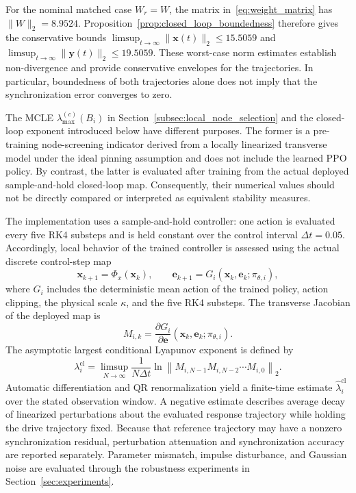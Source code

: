\documentclass[a4paper,fleqn]{cas-sc}
\theoremstyle{plain}
\theoremstyle{definition}
\begin{document}
For the nominal matched case $W_r=W$, the matrix in~\eqref{eq:weight_matrix} has $\|W\|_2=8.9524$. Proposition~\ref{prop:closed_loop_boundedness} therefore gives the conservative bounds $\limsup_{t\to\infty}\|\mathbf{x}(t)\|_2\leq15.5059$ and $\limsup_{t\to\infty}\|\mathbf{y}(t)\|_2\leq19.5059$. These worst-case norm estimates establish non-divergence and provide conservative envelopes for the trajectories. In particular, boundedness of both trajectories alone does not imply that the synchronization error converges to zero.

The MCLE $\lambda_{\max}^{(c)}(B_i)$ in Section~\ref{subsec:local_node_selection} and the closed-loop exponent introduced below have different purposes. The former is a pre-training node-screening indicator derived from a locally linearized transverse model under the ideal pinning assumption and does not include the learned PPO policy. By contrast, the latter is evaluated after training from the actual deployed sample-and-hold closed-loop map. Consequently, their numerical values should not be directly compared or interpreted as equivalent stability measures.

The implementation uses a sample-and-hold controller: one action is evaluated every five RK4 substeps and is held constant over the control interval $\Delta t=0.05$. Accordingly, local behavior of the trained controller is assessed using the actual discrete control-step map
\begin{equation}
	\mathbf{x}_{k+1}=\Phi_x(\mathbf{x}_k),
	\qquad
	\mathbf{e}_{k+1}=G_i(\mathbf{x}_k,\mathbf{e}_k;\pi_{\theta,i}),
	\label{eq:sampled_closed_loop_map}
\end{equation}
where $G_i$ includes the deterministic mean action of the trained policy, action clipping, the physical scale $\kappa$, and the five RK4 substeps. The transverse Jacobian of the deployed map is
\begin{equation}
	M_{i,k}
	=
	\frac{\partial G_i}{\partial\mathbf{e}}
	(\mathbf{x}_k,\mathbf{e}_k;\pi_{\theta,i}).
	\label{eq:sampled_error_jacobian}
\end{equation}
The asymptotic largest conditional Lyapunov exponent is defined by
\begin{equation}
	\lambda_i^{\mathrm{cl}}
	=
	\limsup_{N\to\infty}
	\frac{1}{N\Delta t}
	\ln
	\left\|
	M_{i,N-1}M_{i,N-2}\cdots M_{i,0}
	\right\|_2.
	\label{eq:closed_loop_conditional_lyapunov}
\end{equation}
Automatic differentiation and QR renormalization yield a finite-time estimate $\widehat\lambda_i^{\mathrm{cl}}$ over the stated observation window. A negative estimate describes average decay of linearized perturbations about the evaluated response trajectory while holding the drive trajectory fixed. Because that reference trajectory may have a nonzero synchronization residual, perturbation attenuation and synchronization accuracy are reported separately. Parameter mismatch, impulse disturbance, and Gaussian noise are evaluated through the robustness experiments in Section~\ref{sec:experiments}.
\end{document}

